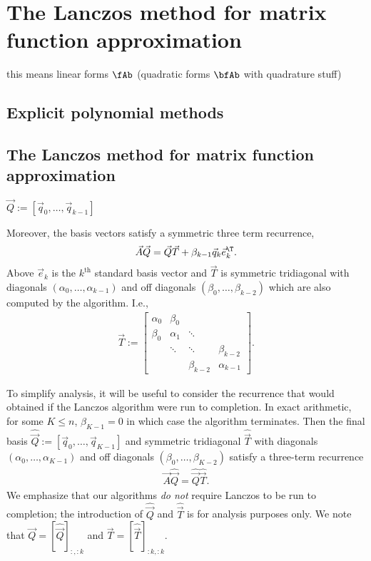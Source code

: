 \chapter{The Lanczos  method for matrix function approximation}

this means linear forms \( \fAb \) (quadratic forms \( \bfAb \) with quadrature stuff)



\section{Explicit polynomial methods}



\section{The Lanczos method for matrix function approximation}



\( \vec{Q} := [ \vec{q}_0 , \ldots , \vec{q}_{k-1} ] \)

Moreover, the basis vectors satisfy a symmetric three term recurrence,
$$
\vec{A} \vec{Q} = \vec{Q} \vec{T} + \beta_{k-1} \vec{q}_{k} \vec{e}_k^\T.
$$
Above $\vec{e}_k$ is the $k^\text{th}$ standard basis vector and $\vec{T}$ is symmetric tridiagonal with  diagonals $(\alpha_0, \ldots, \alpha_{k-1})$ and off diagonals $(\beta_0, \ldots, \beta_{k-2})$  which are also computed by the algorithm. I.e., 
\begin{align*}
    {\vec{T}}
    := \begin{bmatrix}
        \alpha_0 & \beta_0 \\
        \beta_0 & \alpha_1 & \ddots \\
        & \ddots & \ddots & \beta_{k-2}\\
        & & \beta_{k-2} & \alpha_{k-1}
    \end{bmatrix}.
\end{align*}

To simplify analysis, it will be useful to consider the recurrence that would obtained if the Lanczos algorithm were run to completion. 
In exact arithmetic, for some $K\leq n$, $\beta_{K-1} = 0$ in which case the algorithm terminates. 
Then the final basis \( \widehat{\vec{Q}} := [ \vec{q}_0 , \ldots , \vec{q}_{K-1} ]\) and symmetric tridiagonal $\widehat{\vec{T}}$ with  diagonals $(\alpha_0, \ldots, \alpha_{K-1})$ and off diagonals $(\beta_0, \ldots, \beta_{K-2})$
satisfy
 a three-term recurrence 
\begin{align*}
    \vec{A} \widehat{\vec{Q}} = \widehat{\vec{Q}} \widehat{\vec{T}}.
\end{align*}
We emphasize that our algorithms \emph{do not} require Lanczos to be run to completion; the introduction of $\widehat{\vec{Q}}$ and $\widehat{\vec{T}}$ is for analysis purposes only.
We note that $\vec{Q} = [\widehat{\vec{Q}}]_{:,:k}$ and $\vec{T} =[\widehat{\vec{T}}]_{:k,:k}$.

